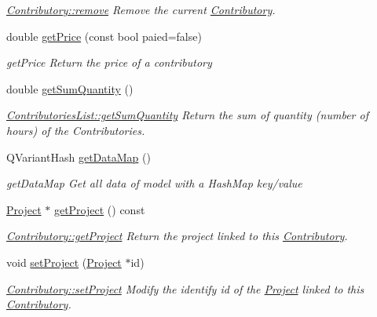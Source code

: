\begin{DoxyCompactItemize}
\begin{DoxyCompactList}\small\item\em \hyperlink{classModels_1_1Contributory_ab9971d7867516b488095e63e1179eac8}{Contributory\+::remove} Remove the current \hyperlink{classModels_1_1Contributory}{Contributory}. \end{DoxyCompactList}\item 
double \hyperlink{classModels_1_1Contributory_ac8eb5c2589dd05bba5b51ac190ecd778}{get\+Price} (const bool paied=false)
\begin{DoxyCompactList}\small\item\em get\+Price Return the price of a contributory \end{DoxyCompactList}\item 
double \hyperlink{classModels_1_1Contributory_aa6f3e9018846a83d192b8fb427fe0481}{get\+Sum\+Quantity} ()
\begin{DoxyCompactList}\small\item\em \hyperlink{classModels_1_1ContributoriesList_af9b3b1b703cebeef552d058999ffcc4c}{Contributories\+List\+::get\+Sum\+Quantity} Return the sum of quantity (number of hours) of the Contributories. \end{DoxyCompactList}\item 
Q\+Variant\+Hash \hyperlink{classModels_1_1Contributory_a692f563f0428866441ea8bc2b9e772ca}{get\+Data\+Map} ()
\begin{DoxyCompactList}\small\item\em get\+Data\+Map Get all data of model with a Hash\+Map key/value \end{DoxyCompactList}\item 
\hyperlink{classModels_1_1Project}{Project} $\ast$ \hyperlink{classModels_1_1Contributory_a49379aeb4de2376d5a2aaf10f54daf05}{get\+Project} () const 
\begin{DoxyCompactList}\small\item\em \hyperlink{classModels_1_1Contributory_a49379aeb4de2376d5a2aaf10f54daf05}{Contributory\+::get\+Project} Return the project linked to this \hyperlink{classModels_1_1Contributory}{Contributory}. \end{DoxyCompactList}\item 
void \hyperlink{classModels_1_1Contributory_a4478894daf317068856b707491d03555}{set\+Project} (\hyperlink{classModels_1_1Project}{Project} $\ast$id)
\begin{DoxyCompactList}\small\item\em \hyperlink{classModels_1_1Contributory_a4478894daf317068856b707491d03555}{Contributory\+::set\+Project} Modify the identify {\itshape id} of the \hyperlink{classModels_1_1Project}{Project} linked to this \hyperlink{classModels_1_1Contributory}{Contributory}. \end{DoxyCompactList}\item 

\end{DoxyCompactItemize}
